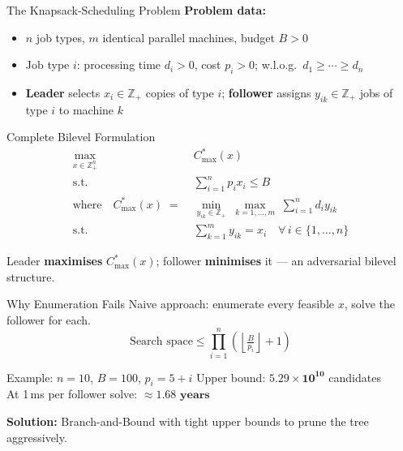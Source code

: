 \documentclass[fleqn,11pt,aspectratio=43]{beamer}
\newcommand{\Copt}{C_{\max}^{*}}
\begin{document}
\begin{frame}[shrink=5]{The Knapsack-Scheduling Problem}
  \textbf{Problem data:}
  \begin{itemize}
    \item $n$ job types, $m$ identical parallel machines, budget $B>0$
    \item Job type $i$: processing time $d_i>0$, cost $p_i>0$; w.l.o.g.\ $d_1\geq\cdots\geq d_n$
    \item \textbf{Leader} selects $x_i\in\mathbb{Z}_+$ copies of type $i$;
          \textbf{follower} assigns $y_{ik}\in\mathbb{Z}_+$ jobs of type $i$ to machine $k$
  \end{itemize}
  \begin{block}{Complete Bilevel Formulation}
    \vspace{-0.2em}
    \begin{align*}
      \max_{x\in\mathbb{Z}_+^n}\quad & \Copt(x)\\
      \text{s.t.}\quad & \textstyle\sum_{i=1}^{n}p_ix_i\leq B\\[0.4em]
      \text{where}\quad\Copt(x)\;=\;& \min_{y_{ik}\in\mathbb{Z}_+}\;\max_{k=1,\ldots,m}\;\sum_{i=1}^{n}d_i y_{ik}\\
      \text{s.t.}\quad & \textstyle\sum_{k=1}^{m}y_{ik}=x_i\quad\forall\,i \in\{1,\ldots,n\}
    \end{align*}
    \vspace{-0.3em}
  \end{block}
  \smallskip
  Leader \textbf{maximises} $\Copt(x)$; follower \textbf{minimises} it — an adversarial bilevel structure.
\end{frame}




\begin{frame}{Why Enumeration Fails}
  Naive approach: enumerate every feasible $x$, solve the follower for each.
  \[
    \text{Search space} \leq \prod_{i=1}^{n}\!\left(\!\left\lfloor\tfrac{B}{p_i}\right\rfloor+1\right)
  \]
  \begin{block}{Example: $n=10$, $B=100$, $p_i=5{+}i$}
    Upper bound: $\mathbf{5.29\times 10^{10}}$ candidates\\[0.2em]
    At 1\,ms per follower solve: $\approx\mathbf{1.68\text{ years}}$
  \end{block}
  \bigskip
  \textbf{Solution:} Branch-and-Bound with tight upper bounds to prune the tree aggressively.
\end{frame}
\end{document}
